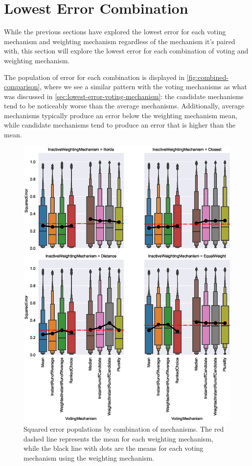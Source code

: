 \section{Lowest Error Combination}\label{sec:lowest-error-overall-combination}
While the previous sections have explored the lowest error for each voting mechanism and
weighting mechanism regardless of the mechanism it's paired with, this section will
explore the lowest error for each combination of voting and weighting mechanism.

The population of error for each combination is displayed in
\autoref{fig:combined-comparison}, where we see a similar pattern with the voting
mechanisms as what was discussed in \autoref{sec:lowest-error-voting-mechanism}: the
candidate mechanisms tend to be noticeably worse than the average mechanisms.
Additionally, average mechanisms typically produce an error below the weighting
mechanism mean, while candidate mechanisms tend to produce an error that is higher
than the mean.

\begin{figure}[htbp]
    \centering
    \includegraphics[scale=0.75]
    {./content/figures/combinations/combined_comparison}
    \caption{Squared error populations by combination of mechanisms. The red dashed
    line represents the mean for each weighting mechanism, while the black line with
    dots are the means for each voting mechanism using the weighting mechanism.}
    \label{fig:combined-comparison}
\end{figure}

